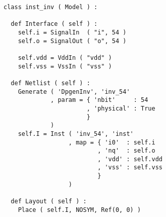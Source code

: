 \begin{itemize}
\begin{verbatim}
class inst_inv ( Model ) :

  def Interface ( self ) :
    self.i = SignalIn  ( "i", 54 )
    self.o = SignalOut ( "o", 54 )

    self.vdd = VddIn ( "vdd" )
    self.vss = VssIn ( "vss" )
    
  def Netlist ( self ) :
    Generate ( 'DpgenInv', 'inv_54'
             , param = { 'nbit'     : 54
                       , 'physical' : True
                       }
             )      
    self.I = Inst ( 'inv_54', 'inst'
                  , map = { 'i0'  : self.i
                          , 'nq'  : self.o
                          , 'vdd' : self.vdd
                          , 'vss' : self.vss
                          }
                  )
    
  def Layout ( self ) :
    Place ( self.I, NOSYM, Ref(0, 0) )
\end{verbatim}
\end{itemize}
